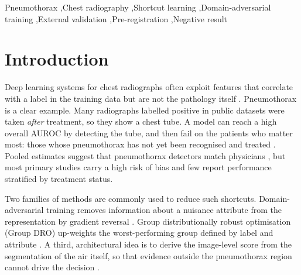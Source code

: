 \documentclass[final,3p]{elsarticle}
\begin{document}
\begin{frontmatter}
\begin{abstract}
\textbf{Conclusions:} Adversarial removal of a noisy, pseudo-labelled device attribute did not reduce, and appeared to increase, reliance on devices. The shortcut is present in every architecture tested, including a radiology foundation model. Untreated-stratum performance should be reported routinely for pneumothorax models.
\end{abstract}

\begin{keyword}
Pneumothorax \sep Chest radiography \sep Shortcut learning \sep Domain-adversarial training \sep External validation \sep Pre-registration \sep Negative result
\end{keyword}

\end{frontmatter}

\section{Introduction}
\label{sec:intro}

Deep learning systems for chest radiographs often exploit features that correlate with a label in the training data but are not the pathology itself \citep{geirhos2020shortcut,zech2018variable,degrave2021covid,badgeley2019hip,banerjee2023shortcuts}. Pneumothorax is a clear example. Many radiographs labelled positive in public datasets were taken \emph{after} treatment, so they show a chest tube. A model can reach a high overall AUROC by detecting the tube, and then fail on the patients who matter most: those whose pneumothorax has not yet been recognised and treated \citep{oakdenrayner2020hidden,taylor2018pneumothorax,rueckel2020tubes}. Pooled estimates suggest that pneumothorax detectors match physicians \citep{sugibayashi2023meta,katzman2024meta}, but most primary studies carry a high risk of bias and few report performance stratified by treatment status.

Two families of methods are commonly used to reduce such shortcuts. Domain-adversarial training removes information about a nuisance attribute from the representation by gradient reversal \citep{ganin2015dann,kim2019learning,zhao2020confounder}. Group distributionally robust optimisation (Group DRO) up-weights the worst-performing group defined by label and attribute \citep{sagawa2020groupdro}. A third, architectural idea is to derive the image-level score from the segmentation of the air itself, so that evidence outside the pneumothorax region cannot drive the decision \citep{rueckel2021annotations}.
\end{document}
